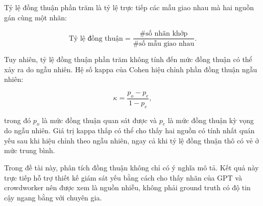 Tỷ lệ đồng thuận phần trăm là tỷ lệ trực tiếp các mẫu giao nhau mà hai nguồn gán cùng một nhãn:

\begin{equation}
    \text{Tỷ lệ đồng thuận} =
    \frac{\#\text{số nhãn khớp}}{\#\text{số mẫu giao nhau}}.
\end{equation}

Tuy nhiên, tỷ lệ đồng thuận phần trăm không tính đến mức đồng thuận có thể xảy ra do ngẫu nhiên. Hệ số kappa của Cohen hiệu chỉnh phần đồng thuận ngẫu nhiên:

\begin{equation}
    \kappa =
    \frac{p_o - p_e}{1 - p_e},
\end{equation}

trong đó \(p_o\) là mức đồng thuận quan sát được và \(p_e\) là mức đồng thuận kỳ vọng do ngẫu nhiên. Giá trị kappa thấp có thể cho thấy hai nguồn có tính nhất quán yếu sau khi hiệu chỉnh theo ngẫu nhiên, ngay cả khi tỷ lệ đồng thuận thô có vẻ ở mức trung bình.

Trong đề tài này, phân tích đồng thuận không chỉ có ý nghĩa mô tả. Kết quả này trực tiếp hỗ trợ thiết kế giám sát yếu bằng cách cho thấy nhãn của GPT và crowdworker nên được xem là nguồn nhiễu, không phải ground truth có độ tin cậy ngang bằng với chuyên gia.
